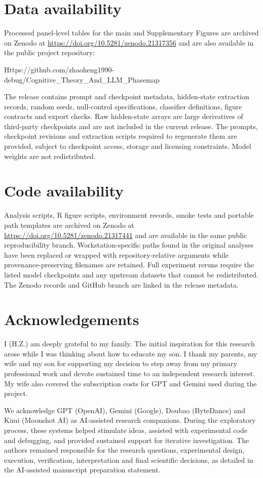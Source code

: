 \documentclass[11pt]{article}
\begin{document}
{\setlength{\parindent}{0pt}
\section{Data availability}
Processed panel-level tables for the main and Supplementary Figures are archived on Zenodo at \url{https://doi.org/10.5281/zenodo.21317356} and are also available in the public project repository:

Https://github.com/zhaoheng1990-debug/Cognitive\_Theory\_And\_LLM\_Phasemap

The release contains prompt and checkpoint metadata, hidden-state extraction records, random seeds, null-control specifications, classifier definitions, figure contracts and export checks. Raw hidden-state arrays are large derivatives of third-party checkpoints and are not included in the current release. The prompts, checkpoint revisions and extraction scripts required to regenerate them are provided, subject to checkpoint access, storage and licensing constraints. Model weights are not redistributed.

\section{Code availability}
Analysis scripts, R figure scripts, environment records, smoke tests and portable path templates are archived on Zenodo at \url{https://doi.org/10.5281/zenodo.21317441} and are available in the same public reproducibility branch. Workstation-specific paths found in the original analyses have been replaced or wrapped with repository-relative arguments while provenance-preserving filenames are retained. Full experiment reruns require the listed model checkpoints and any upstream datasets that cannot be redistributed. The Zenodo records and GitHub branch are linked in the release metadata.

\section{Acknowledgements}
I (H.Z.) am deeply grateful to my family. The initial inspiration for this research arose while I was thinking about how to educate my son. I thank my parents, my wife and my son for supporting my decision to step away from my primary professional work and devote sustained time to an independent research interest. My wife also covered the subscription costs for GPT and Gemini used during the project.

We acknowledge GPT (OpenAI), Gemini (Google), Doubao (ByteDance) and Kimi (Moonshot AI) as AI-assisted research companions. During the exploratory process, these systems helped stimulate ideas, assisted with experimental code and debugging, and provided sustained support for iterative investigation. The authors remained responsible for the research questions, experimental design, execution, verification, interpretation and final scientific decisions, as detailed in the AI-assisted manuscript preparation statement.

}
\end{document}
